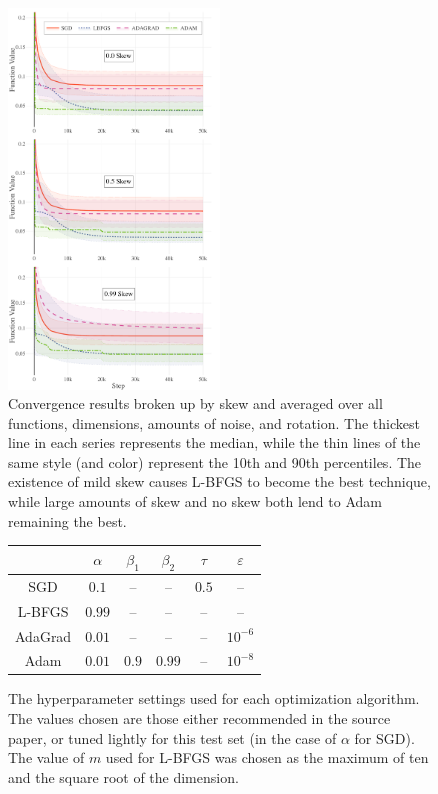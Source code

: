 \documentclass[letterpaper, 10 pt, conference]{IEEEtran}  %
\begin{document}
\begin{figure}
  \centering
  \includegraphics[width=0.5\textwidth]{Figures/final-skew}
  \caption{Convergence results broken up by skew and averaged over all
    functions, dimensions, amounts of noise, and rotation. The
    thickest line in each series represents the median, while the thin
    lines of the same style (and color) represent the 10th and 90th
    percentiles. The existence of mild skew causes L-BFGS to become
    the best technique, while large amounts of skew and no skew both
    lend to Adam remaining the best.}
  \label{fig:results-skew}
  \vspace{1.2cm}
\end{figure}

\begin{figure}
  \centering
  \begin{tabular}{|c|c|c|c|c|c|}
    \hline
    & $\alpha$ & $\beta_1$ & $\beta_2$ & $\tau$ & $\varepsilon$ \\
    \hline
    SGD     & $0.1$  & -- & -- & $0.5$ & -- \\
    L-BFGS & $0.99$ & -- & -- & -- & -- \\
    AdaGrad & $0.01$ & -- & -- & -- & $10^{-6}$ \\
    Adam    & $0.01$ & $0.9$ & $0.99$ & -- & $10^{-8}$ \\
    \hline
  \end{tabular}
  \caption{The hyperparameter settings used for each optimization
    algorithm. The values chosen are those either recommended in the
    source paper, or tuned lightly for this test set (in the case of
    $\alpha$ for SGD). The value of $m$ used for L-BFGS was chosen as
    the maximum of ten and the square root of the dimension.}
  \label{tab:hypeparam}
  \vspace{0.4cm}
\end{figure}
\end{document}
